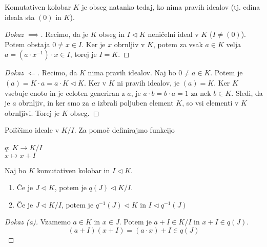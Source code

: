 \documentclass[11pt, a4paper]{article}
\begin{document}
    \begin{proposition}
        Komutativen kolobar \(K\) je obseg natanko tedaj, ko nima pravih idealov (tj. edina ideala sta \((0)\) in \(K\)).
    \end{proposition}

    \begin{proof}[Dokaz \(\implies\)]
        Recimo, da je \(K\) obseg in \(I \triangleleft K\) neničelni ideal v \(K\) (\(I \neq (0)\)). Potem obstaja \(0 \neq x \in I\). Ker je \(x\) obrnljiv v \(K\), potem za vsak \(a \in K\) velja \(a = (a \cdot x^{-1}) \cdot x \in I\), torej je \(I = K\).
    \end{proof}

    \begin{proof}[Dokaz \(\Longleftarrow\)]
        Recimo, da \(K\) nima pravih idealov. Naj bo \(0 \neq a \in K\). Potem je \((a) = K \cdot a = a \cdot K \triangleleft K\). Ker v \(K\) ni pravih idealov, je \((a) = K\). Ker  \(K\) vsebuje enoto in je celoten generiran z \(a\), je \(a \cdot b = b \cdot a = 1\) za nek \(b \in K\). Sledi, da je \(a\) obrnljiv, in ker smo za \(a\) izbrali poljuben element \(K\), so vsi elementi v \(K\) obrnljivi. Torej je \(K\) obseg.
    \end{proof}

    Poiščimo ideale v \(K / I\). Za pomoč definirajmo funkcijo
    \begin{center}
        \(q\): \(K \to K/I\) \\
        \(x \mapsto x+I\) \\
    \end{center}

    \begin{proposition}
        Naj bo \(K\) komutativen kolobar in \(I \triangleleft K\).
        \begin{enumerate}[label=\alph*)]
            \item Če je \(J \triangleleft K\), potem je \(q(J) \triangleleft K / I\).
            \item Če je \(J \triangleleft K / I\), potem je \(q^{-1}(J) \triangleleft K\) in \(I \triangleleft q^{-1}(J)\) 
        \end{enumerate}
    \end{proposition}

    \begin{proof}[Dokaz \emph{(a)}]
        Vzamemo \(a \in K\) in \(x \in J\). Potem je \(a+I \in K / I\) in \(x + I \in q(J)\).
        \[(a+I)(x+I) = (a \cdot x) + I \in q(J)\]
    \end{proof}
\end{document}
